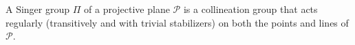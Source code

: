 A Singer group $\Pi$ of a projective plane $\mathcal{P}$ is a collineation group that acts regularly (transitively and with trivial stabilizers) on both the points and lines of $\mathcal{P}$.
